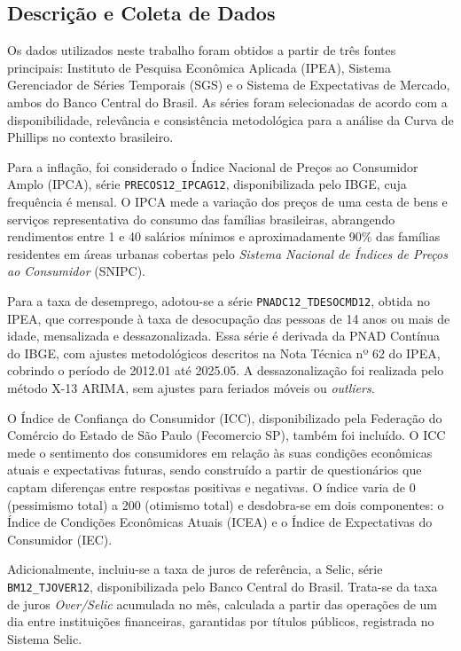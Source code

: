 \documentclass[12pt,oneside]{abntex2}
\begin{document}
\subsection{\textbf{Descrição e Coleta de Dados}}

Os dados utilizados neste trabalho foram obtidos a partir de três fontes principais: Instituto de Pesquisa Econômica Aplicada (IPEA), Sistema Gerenciador de Séries Temporais (SGS) e o Sistema de Expectativas de Mercado, ambos do Banco Central do Brasil. As séries foram selecionadas de acordo com a disponibilidade, relevância e consistência metodológica para a análise da Curva de Phillips no contexto brasileiro.

Para a inflação, foi considerado o Índice Nacional de Preços ao Consumidor Amplo (IPCA), série \texttt{PRECOS12\_IPCAG12}, disponibilizada pelo IBGE, cuja frequência é mensal. O IPCA mede a variação dos preços de uma cesta de bens e serviços representativa do consumo das famílias brasileiras, abrangendo rendimentos entre 1 e 40 salários mínimos e aproximadamente 90\% das famílias residentes em áreas urbanas cobertas pelo \textit{Sistema Nacional de Índices de Preços ao Consumidor} (SNIPC).

Para a taxa de desemprego, adotou-se a série \texttt{PNADC12\_TDESOCMD12}, obtida no IPEA, que corresponde à taxa de desocupação das pessoas de 14 anos ou mais de idade, mensalizada e dessazonalizada. Essa série é derivada da PNAD Contínua do IBGE, com ajustes metodológicos descritos na Nota Técnica nº 62 do IPEA, cobrindo o período de 2012.01 até 2025.05. A dessazonalização foi realizada pelo método X-13 ARIMA, sem ajustes para feriados móveis ou \textit{outliers}.

O Índice de Confiança do Consumidor (ICC), disponibilizado pela Federação do Comércio do Estado de São Paulo (Fecomercio SP), também foi incluído. O ICC mede o sentimento dos consumidores em relação às suas condições econômicas atuais e expectativas futuras, sendo construído a partir de questionários que captam diferenças entre respostas positivas e negativas. O índice varia de 0 (pessimismo total) a 200 (otimismo total) e desdobra-se em dois componentes: o Índice de Condições Econômicas Atuais (ICEA) e o Índice de Expectativas do Consumidor (IEC).

Adicionalmente, incluiu-se a taxa de juros de referência, a Selic, série \texttt{BM12\_TJOVER12}, disponibilizada pelo Banco Central do Brasil. Trata-se da taxa de juros \textit{Over/Selic} acumulada no mês, calculada a partir das operações de um dia entre instituições financeiras, garantidas por títulos públicos, registrada no Sistema Selic.
\end{document}
